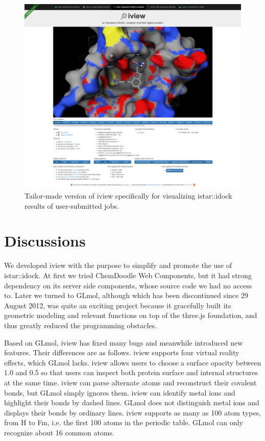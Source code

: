 \begin{figure}
\begin{center}
\includegraphics{../iview/idock.png}
\end{center}
\caption{Tailor-made version of iview specifically for visualizing istar::idock results of user-submitted jobs.}
\label{fig:idock}
\end{figure}

\section{Discussions}

We developed iview with the purpose to simplify and promote the use of istar::idock. At first we tried ChemDoodle Web Components, but it had strong dependency on its server side components, whose source code we had no access to. Later we turned to GLmol, although which has been discontinued since 29 August 2012, was quite an exciting project because it gracefully built its geometric modeling and relevant functions on top of the three.js foundation, and thus greatly reduced the programming obstacles.

Based on GLmol, iview has fixed many bugs and meanwhile introduced new features. Their differences are as follows. iview supports four virtual reality effects, which GLmol lacks. iview allows users to choose a surface opacity between 1.0 and 0.5 so that users can inspect both protein surface and internal structures at the same time. iview can parse alternate atoms and reconstruct their covalent bonds, but GLmol simply ignores them. iview can identify metal ions and highlight their bonds by dashed lines. GLmol does not distinguish metal ions and displays their bonds by ordinary lines. iview supports as many as 100 atom types, from H to Fm, i.e. the first 100 atoms in the periodic table. GLmol can only recognize about 16 common atoms.

